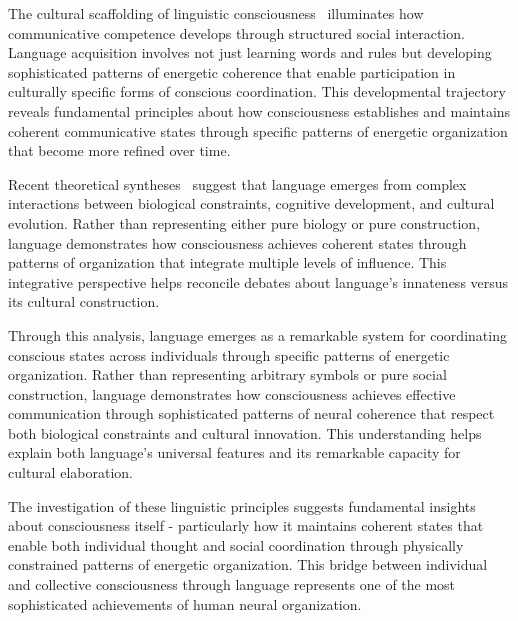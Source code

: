 The cultural scaffolding of linguistic consciousness~\cite{Vygotsky2012, pinotsis2023cytoelectric, Tomasello2008, zheng2025unbearable} illuminates how communicative competence develops through structured social interaction. Language acquisition involves not just learning words and rules but developing sophisticated patterns of energetic coherence that enable participation in culturally specific forms of conscious coordination. This developmental trajectory reveals fundamental principles about how consciousness establishes and maintains coherent communicative states through specific patterns of energetic organization that become more refined over time.

Recent theoretical syntheses~\cite{Christiansen2016, van2025processes} suggest that language emerges from complex interactions between biological constraints, cognitive development, and cultural evolution. Rather than representing either pure biology or pure construction, language demonstrates how consciousness achieves coherent states through patterns of organization that integrate multiple levels of influence. This integrative perspective helps reconcile debates about language's innateness versus its cultural construction.


Through this analysis, language emerges as a remarkable system for coordinating conscious states across individuals through specific patterns of energetic organization. Rather than representing arbitrary symbols or pure social construction, language demonstrates how consciousness achieves effective communication through sophisticated patterns of neural coherence that respect both biological constraints and cultural innovation. This understanding helps explain both language's universal features and its remarkable capacity for cultural elaboration.

The investigation of these linguistic principles suggests fundamental insights about consciousness itself - particularly how it maintains coherent states that enable both individual thought and social coordination through physically constrained patterns of energetic organization. This bridge between individual and collective consciousness through language represents one of the most sophisticated achievements of human neural organization.

